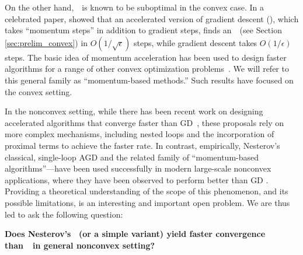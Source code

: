 On the other hand,~\gd~is known to be suboptimal in the convex case. 
In a celebrated paper, \citet{nesterov1983method} showed that an accelerated version of
gradient descent (\nag), which takes ``momentum steps'' in addition to gradient steps, finds an~\ESP~(see Section \ref{sec:prelim_convex}) in  $O(1/\sqrt{\epsilon})$ 
steps, while gradient descent takes $O(1/\epsilon)$ steps. The basic idea of momentum acceleration
has been used to design faster algorithms for a range of other convex optimization 
problems~\citep{beck2009fast,nesterov2012efficiency,lee2013efficient}.
We will refer to this general family as ``momentum-based methods.''
Such results have focused on the convex setting. 

In the nonconvex setting, while there has been recent work on designing accelerated 
algorithms that converge faster than GD~\citep[see, e.g.,][]{agarwal2017finding, carmon2016accelerated,carmon2017convex}, these proposals rely on more complex mechanisms,
including nested loops and the incorporation of proximal terms to achieve the
faster rate.  In contrast, empirically, Nesterov's classical, single-loop
AGD and the related family of ``momentum-based algorithms''---have been 
used successfully in modern large-scale nonconvex applications, where they
have been observed to perform better than GD \citep{sutskever2013importance}.
Providing a theoretical understanding of the scope of this phenomenon, and its
possible limitations, is an interesting and important open problem.
We are thus led to ask the following question: 

\textbf{Does Nesterov's \nag~(or a simple variant) yield faster convergence than~\gd~in 
general nonconvex setting?}



